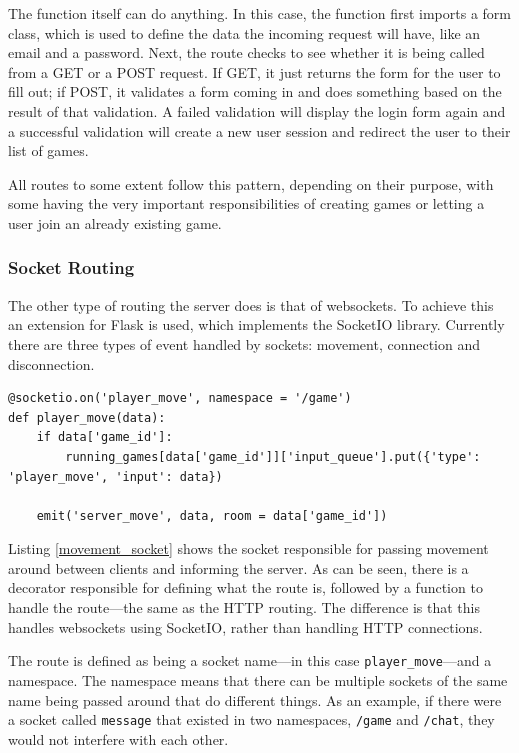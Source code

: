 The function itself can do anything. In this case, the function first imports a form class, which is used to define the data the incoming request will have, like an email and a password. Next, the route checks to see whether it is being called from a GET or a POST request. If GET, it just returns the form for the user to fill out; if POST, it validates a form coming in and does something based on the result of that validation. A failed validation will display the login form again and a successful validation will create a new user session and redirect the user to their list of games.

All routes to some extent follow this pattern, depending on their purpose, with some having the very important responsibilities of creating games or letting a user join an already existing game.

\subsubsection{Socket Routing}
The other type of routing the server does is that of websockets. To achieve this an extension for Flask is used, which implements the SocketIO library. Currently there are three types of event handled by sockets: movement, connection and disconnection.

\noindent
\begin{minipage}{\linewidth}
\begin{lstlisting}[style=py, caption={Socket for passing movement events between clients and server.}, label=movement_socket]
@socketio.on('player_move', namespace = '/game')
def player_move(data):
    if data['game_id']:
        running_games[data['game_id']]['input_queue'].put({'type': 'player_move', 'input': data})

    emit('server_move', data, room = data['game_id'])
\end{lstlisting}
\end{minipage}

Listing \ref{movement_socket} shows the socket responsible for passing movement around between clients and informing the server. As can be seen, there is a decorator responsible for defining what the route is, followed by a function to handle the route---the same as the HTTP routing. The difference is that this handles websockets using SocketIO, rather than handling HTTP connections.

The route is defined as being a socket name---in this case \texttt{player\_move}---and a namespace. The namespace means that there can be multiple sockets of the same name being passed around that do different things. As an example, if there were a socket called \texttt{message} that existed in two namespaces, \texttt{/game} and \texttt{/chat}, they would not interfere with each other.

